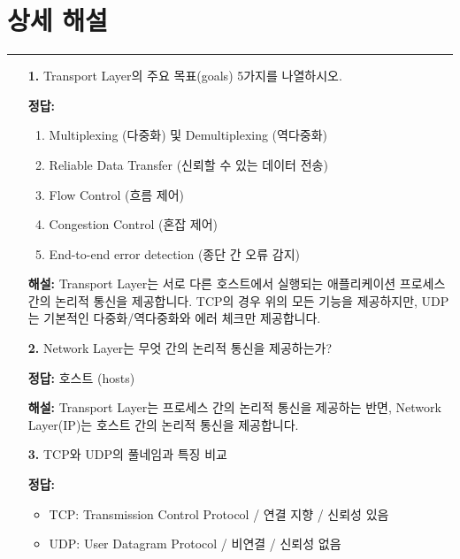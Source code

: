 \documentclass[a4paper, 10pt]{article}
\newcommand{\sectionbox}[1]{
  \vspace{0.5em}
  \noindent\fbox{\textbf{#1}}
  \vspace{0.5em}
}
\begin{document}
\section*{상세 해설}
\noindent\rule{\textwidth}{0.8pt}

\begin{enumerate}[itemsep=2.5em, leftmargin=2em, label={}]

\item[] \sectionbox{I. 용어 및 기본 개념 (8문제)}

\item[\textbf{1.}] Transport Layer의 주요 목표(goals) 5가지를 나열하시오.
\vspace{0.5em}

\noindent\textbf{정답:}
\begin{enumerate}[itemsep=0.3em]
    \item Multiplexing (다중화) 및 Demultiplexing (역다중화)
    \item Reliable Data Transfer (신뢰할 수 있는 데이터 전송)
    \item Flow Control (흐름 제어)
    \item Congestion Control (혼잡 제어)
    \item End-to-end error detection (종단 간 오류 감지)
\end{enumerate}

\small\textbf{해설:} Transport Layer는 서로 다른 호스트에서 실행되는 애플리케이션 프로세스 간의 논리적 통신을 제공합니다. TCP의 경우 위의 모든 기능을 제공하지만, UDP는 기본적인 다중화/역다중화와 에러 체크만 제공합니다.

\item[\textbf{2.}] Network Layer는 무엇 간의 논리적 통신을 제공하는가?
\vspace{0.5em}

\noindent\textbf{정답:} 호스트 (hosts)

\small\textbf{해설:} Transport Layer는 프로세스 간의 논리적 통신을 제공하는 반면, Network Layer(IP)는 호스트 간의 논리적 통신을 제공합니다.

\item[\textbf{3.}] TCP와 UDP의 풀네임과 특징 비교
\vspace{0.5em}

\noindent\textbf{정답:}
\begin{itemize}[itemsep=0.3em]
    \item TCP: Transmission Control Protocol / 연결 지향 / 신뢰성 있음
    \item UDP: User Datagram Protocol / 비연결 / 신뢰성 없음
\end{itemize}


\end{enumerate}
\end{document}
